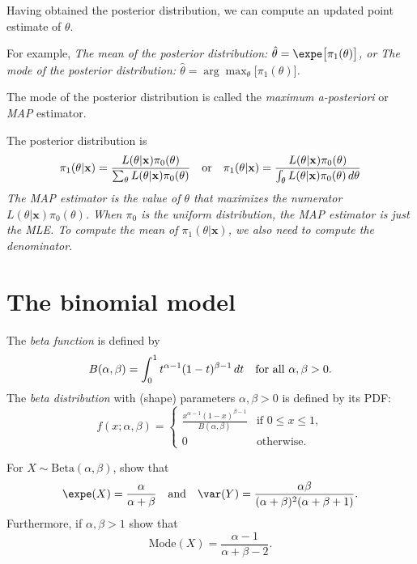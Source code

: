 
Having obtained the posterior distribution, we can compute an updated point estimate of $\theta$.

For example,
\bit
\it The mean of the posterior distribution: $\hat{\theta} = \expe\big[\pi_1(\theta)\big]$, or
\it The mode of the posterior distribution: $\hat{\theta} = \arg\max_{\theta}\big[\pi_1(\theta)\big]$.
\eit

\begin{definition}
The mode of the posterior distribution is called the \emph{maximum a-posteriori} or \emph{MAP} estimator.
\end{definition}

\begin{remark}
The posterior distribution is
\[
\pi_1(\theta|\mathbf{x}) = 
\displaystyle\frac{L(\theta|\mathbf{x})\pi_0(\theta)}{\sum_{\theta}L(\theta|\mathbf{x})\pi_0(\theta)}
\text{\quad or\quad}
\pi_1(\theta|\mathbf{x}) =
\displaystyle\frac{L(\theta|\mathbf{x})\pi_0(\theta)}{\int_{\theta}L(\theta|\mathbf{x})\pi_0(\theta)\,d\theta}
\]
\bit
\it 
The MAP estimator is the value of $\theta$ that maximizes the numerator $L(\theta|\mathbf{x})\pi_0(\theta)$.
\it
When $\pi_0$ is the uniform distribution, the MAP estimator is just the MLE.
\it
To compute the mean of $\pi_1(\theta|\mathbf{x})$, we also need to compute the denominator.
\eit
\end{remark}


\section{The binomial model}
The \emph{beta function} is defined by
\[
B(\alpha,\beta) = \int_0^1 t^{\alpha-1}(1-t)^{\beta-1}\,dt \text{\quad for all $\alpha,\beta>0$.}
\]
The \emph{beta distribution} with (shape) parameters $\alpha,\beta>0$ is defined by its PDF:
\[
f(x;\alpha,\beta) = \left\{\begin{array}{ll}
	\displaystyle\frac{ x^{\alpha-1} (1-x)^{\beta-1} }{B(\alpha,\beta)} & \text{if $0\leq x\leq 1$}, \\
	0												& \text{otherwise.}
\end{array}\right.
\]
\vspace*{-1ex}
\begin{exercise}
For $X\sim\text{Beta}(\alpha,\beta)$, show that
\[
\expe(X) = \frac{\alpha}{\alpha+\beta} \text{\quad and\quad} \var(Y) = \frac{\alpha\beta}{(\alpha+\beta)^2(\alpha+\beta+1)}. 
\]
Furthermore, if $\alpha,\beta > 1$ show that
\[
\text{Mode}(X) = \frac{\alpha-1}{\alpha+\beta-2}.
\]
\end{exercise}

